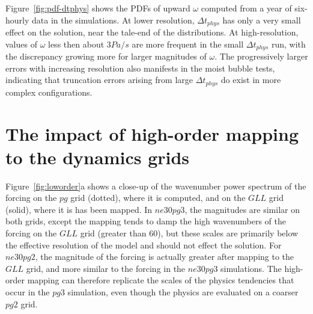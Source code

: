\documentclass{agujournal}
\begin{document}
Figure~\ref{fig:pdf-dtphys} shows the PDFs of upward $\omega$ computed from a year of six-hourly data in the simulations. At lower resolution, $\Delta t_{phys}$ has only a very small effect on the solution, near the tale-end of the distributions. At high-resolution, values of $\omega$ less then about $3 Pa/s$ are more frequent in the small $\Delta t_{phys}$ run, with the discrepancy growing more for larger magnitudes of $\omega$. The progressively larger errors with increasing resolution also manifests in the moist bubble tests, indicating that truncation errors arising from large $\Delta t_{phys}$ do exist in more complex configurations.

\section{The impact of high-order mapping to the dynamics grids}\label{sec:app2}

Figure~\ref{fig:loworder}a shows a close-up of the wavenumber power spectrum of the forcing on the $pg$ grid (dotted), where it is computed, and on the $GLL$ grid (solid), where it is has been mapped. In $ne30pg3$, the magnitudes are similar on both grids, except the mapping tends to damp the high wavenumbers of the forcing on the $GLL$ grid (greater than 60), but these scales are primarily below the effective resolution of the model and should not effect the solution. For $ne30pg2$, the magnitude of the forcing is actually greater after mapping to the $GLL$ grid, and more similar to the forcing in the $ne30pg3$ simulations. The high-order mapping can therefore replicate the scales of the physics tendencies that occur in the $pg3$ simulation, even though the physics are evaluated on a coarser $pg2$ grid.
\end{document}
